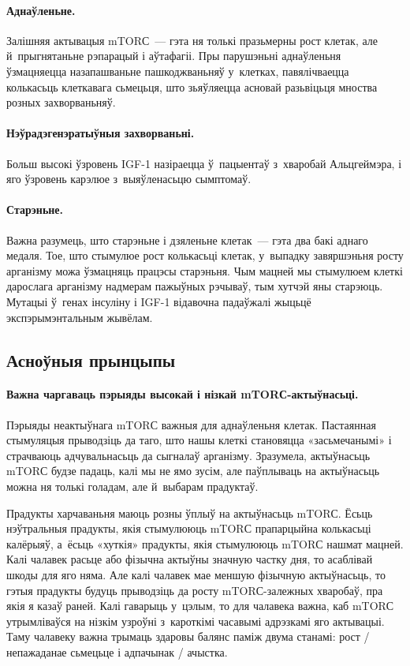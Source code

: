 \paragraph{Аднаўленьне.}
Залішняя актывацыя mTORС~--- гэта ня толькі празьмерны рост клетак, але й~прыгнятаньне рэпарацый і аўтафагіі. Пры парушэньні аднаўленьня ўзмацняецца назапашваньне пашкоджваньняў у~клетках, павялічваецца колькасьць клеткавага сьмецьця, што зьяўляецца асновай разьвіцьця мноства розных захворваньняў.

\paragraph{Нэўрадэгенэратыўныя захворваньні.}
Больш высокі ўзровень IGF-1 назіраецца ў~пацыентаў з~хваробай Альцгеймэра, і яго ўзровень карэлюе з~выяўленасьцю сымптомаў.

\paragraph{Старэньне.}
Важна разумець, што старэньне і дзяленьне клетак~--- гэта два бакі аднаго медаля. Тое, што стымулюе рост колькасьці клетак, у~выпадку завяршэньня росту арганізму можа ўзмацняць працэсы старэньня. Чым мацней мы стымулюем клеткі дарослага арганізму надмерам пажыўных рэчываў, тым хутчэй яны старэюць. Мутацыі ў~генах інсуліну і IGF-1 відавочна падаўжалі жыцьцё экспэрымэнтальным жывёлам.

\subsection{Асноўныя прынцыпы}

\paragraph{Важна чаргаваць пэрыяды высокай і нізкай mTORС-ак\-тыў\-нась\-ці.}
Пэрыяды неактыўнага mTORС важныя для аднаўленьня клетак. Пастаянная стымуляцыя прыводзіць да таго, што нашы клеткі становяцца «засьмечанымі» і страчваюць адчувальнасьць да сыгналаў арганізму. Зразумела, актыўнасьць mTORС будзе падаць, калі мы не ямо зусім, але паўплываць на актыўнасьць можна ня толькі голадам, але й~выбарам прадуктаў.

Прадукты харчаваньня маюць розны ўплыў на актыўнасьць mTORС. Ёсьць нэўтральныя прадукты, якія стымулююць mTORС прапарцыйна колькасьці калёрыяў, а~ёсьць «хуткія» прадукты, якія стымулююць mTORС нашмат мацней. Калі чалавек расьце або фізычна актыўны значную частку дня, то асаблівай шкоды для яго няма. Але калі чалавек мае меншую фізычную актыўнасьць, то гэтыя прадукты будуць прыводзіць да росту mTORС-залежных хваробаў, пра якія я казаў раней. Калі гаварыць у~цэлым, то для чалавека важна, каб mTORС утрымліваўся на нізкім узроўні з~кароткімі часавымі адрэзкамі яго актывацыі. Таму чалавеку важна трымаць здаровы балянс паміж двума станамі: рост / непажаданае сьмецьце і адпачынак / ачыстка.

